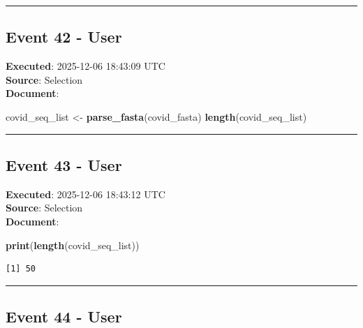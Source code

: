 \documentclass[
  11pt,
]{article}
\newenvironment{Shaded}{\begin{snugshade}}{\end{snugshade}}
\newcommand{\FunctionTok}[1]{\textcolor[rgb]{0.13,0.29,0.53}{\textbf{#1}}}
\newcommand{\NormalTok}[1]{#1}
\newcommand{\OtherTok}[1]{\textcolor[rgb]{0.56,0.35,0.01}{#1}}
\newenvironment{rpoutput}{\vspace{0.5em}\begin{snugshade}}{\end{snugshade}}
\begin{document}
\begin{center}\rule{0.5\linewidth}{0.5pt}\end{center}

\subsection{Event 42 - User}\label{event-42---user}

\textbf{Executed}: 2025-12-06 18:43:09 UTC\\
\textbf{Source}: Selection\\
\textbf{Document}:

\begin{Shaded}
\begin{Highlighting}[]
\NormalTok{covid\_seq\_list }\OtherTok{\textless{}{-}} \FunctionTok{parse\_fasta}\NormalTok{(covid\_fasta)}
\FunctionTok{length}\NormalTok{(covid\_seq\_list)}
\end{Highlighting}
\end{Shaded}

\begin{center}\rule{0.5\linewidth}{0.5pt}\end{center}

\subsection{Event 43 - User}\label{event-43---user}

\textbf{Executed}: 2025-12-06 18:43:12 UTC\\
\textbf{Source}: Selection\\
\textbf{Document}:

\begin{Shaded}
\begin{Highlighting}[]
\FunctionTok{print}\NormalTok{(}\FunctionTok{length}\NormalTok{(covid\_seq\_list))}
\end{Highlighting}
\end{Shaded}

\begin{rpoutput}

\begin{verbatim}
[1] 50
\end{verbatim}

\end{rpoutput}

\begin{center}\rule{0.5\linewidth}{0.5pt}\end{center}

\subsection{Event 44 - User}\label{event-44---user}
\end{document}
